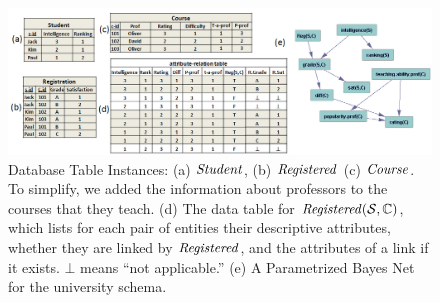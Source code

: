 \documentclass{article}
\begin{document}
 \begin{figure}[htbp] %
   \centering
   \includegraphics[width=7in]{figures/university-tables3.png} 
  \caption{Database Table Instances: (a) $\mathit{Student}$, (b) $\mathit{Registered}$ (c) $\it{Course}$. To simplify, we added the information about professors to the courses that they teach.  (d) The data table for $\mathit{Registered}(\mathcal{S},\mathbb{C})$, which lists for each pair of entities their descriptive attributes, whether they are linked by $\mathit{Registered}$, and the attributes of a link if it exists. $\bot$ means ``not applicable.'' (e) A Parametrized Bayes Net for the university schema.}
   \label{fig:university-tables}
\end{figure}

 



%
\end{document}
